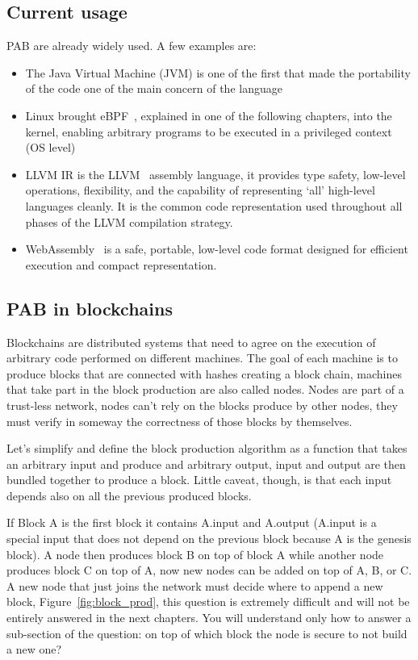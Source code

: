 \documentclass[../main.tex]{subfiles}
\begin{document}
\subsection{Current usage}

PAB are already widely used. A few examples are:

\begin{itemize}
  \item
        The Java Virtual Machine (JVM) is one of the first that made the portability of the code one of the main concern of the language
  \item
        Linux brought eBPF~\cite{ebpf}, explained in one of the following chapters, into the kernel, enabling arbitrary programs to be executed in a privileged context (OS level)
  \item
        LLVM IR is the LLVM~\cite{LLVM} assembly language, it provides type safety, low-level operations, flexibility, and the capability of representing ‘all’ high-level languages cleanly. It is the common code representation used throughout all phases of the LLVM compilation strategy.
  \item
        WebAssembly~\cite{wasm-core-spec} is a safe, portable, low-level code format designed for efficient execution and compact representation.
\end{itemize}

\subsection{PAB in blockchains}

Blockchains are distributed systems that need to agree on the execution of arbitrary code performed on different machines. The goal of each machine is to produce blocks that are connected with hashes creating a block chain, machines that take part in the block production are also called nodes. Nodes are part of a trust-less network, nodes can't rely on the blocks produce by other nodes, they must verify in someway the correctness of those blocks by themselves.

Let's simplify and define the block production algorithm as a function that takes an arbitrary input and produce and arbitrary output, input and output are then bundled together to produce a block. Little caveat, though, is that each input depends also on all the previous produced blocks.

If Block A is the first block it contains A.input and A.output (A.input is a special input that does not depend on the previous block because A is the genesis block). A node then produces block B on top of block A while another node produces block C on top of A, now new nodes can be added on top of A, B, or C. A new node that just joins the network must decide where to append a new block, Figure~\ref{fig:block_prod}, this question is extremely difficult and will not be entirely answered in the next chapters. You will understand only how to answer a sub-section of the question: on top of which block the node is secure to not build a new one?
\end{document}
